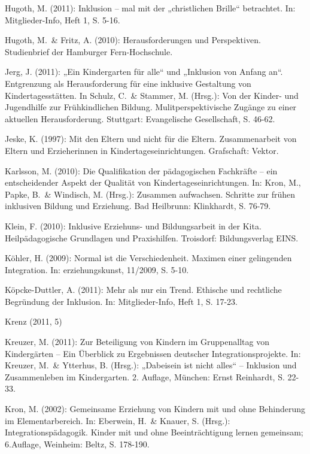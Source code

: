 Hugoth, M. (2011): Inklusion – mal mit der „christlichen Brille“ betrachtet. In: Mitglieder-Info, Heft 1, S. 5-16.

Hugoth, M.~\& Fritz, A. (2010): Herausforderungen und Perspektiven. Studienbrief der Hamburger Fern-Hochschule.

Jerg, J. (2011): „Ein Kindergarten für alle“ und „Inklusion von Anfang an“. Entgrenzung als Herausforderung für eine inklusive Gestaltung von Kindertagesstätten. In Schulz, C.~\& Stammer, M. (Hrsg.): Von der Kinder- und Jugendhilfe zur Frühkindlichen Bildung. Mulitperspektivische Zugänge zu einer aktuellen Herausforderung. Stuttgart: Evangelische Gesellschaft, S. 46-62. 

Jeske, K. (1997): Mit den Eltern und nicht für die Eltern. Zusammenarbeit von Eltern und Erzieherinnen in Kindertageseinrichtungen. Grafschaft: Vektor.

Karlsson, M. (2010): Die Qualifikation der pädagogischen Fachkräfte -- ein entscheidender Aspekt der Qualität von Kindertageseinrichtungen. In: Kron, M., Papke, B.~\& Windisch, M. (Hrsg.): Zusammen aufwachsen. Schritte zur frühen inklusiven Bildung und Erziehung. Bad Heilbrunn: Klinkhardt, S. 76-79. 

Klein, F. (2010): Inklusive Erziehuns- und Bildungsarbeit in der Kita. Heilpädagogische Grundlagen und Praxishilfen. Troisdorf: Bildungsverlag EINS.


Köhler, H. (2009): Normal ist die Verschiedenheit. Maximen einer gelingenden Integration. In: erziehungskunst, 11/2009, S. 5-10.

Köpcke-Duttler, A. (2011): Mehr als nur ein Trend. Ethische und rechtliche Begründung der Inklusion. In: Mitglieder-Info, Heft 1, S. 17-23.

Krenz (2011, 5)

Kreuzer, M. (2011): Zur Beteiligung von Kindern im Gruppenalltag von Kindergärten – Ein Überblick zu Ergebnissen deutscher Integrationsprojekte. In: Kreuzer, M.~\& Ytterhus, B. (Hrsg.): „Dabeisein ist nicht alles“ – Inklusion und Zusammenleben im Kindergarten. 2. Auflage, München: Ernst Reinhardt, S. 22-33.

Kron, M. (2002): Gemeinsame Erziehung von Kindern mit und ohne Behinderung im Elementarbereich. In: Eberwein, H.~\& Knauer, S. (Hrsg.): Integrationspädagogik. Kinder mit und ohne Beeinträchtigung lernen gemeinsam; 6.Auflage, Weinheim: Beltz, S. 178-190. 

